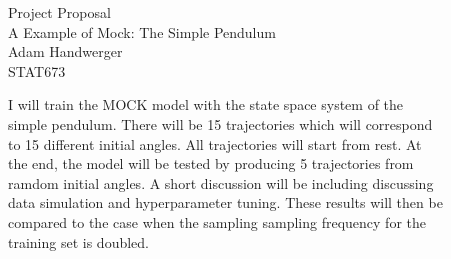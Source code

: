 \documentclass[12pt.]{article}
\begin{document}
\begin{centering}
Project Proposal\\
A Example of Mock: The Simple Pendulum\\
Adam Handwerger\\
STAT673\\
\end{centering}
\vspace{1cm}
I will train the MOCK model with the state space system of the\\
simple pendulum. There will be 15 trajectories which will correspond\\
to 15 different initial angles. All trajectories will start from rest. At\\
the end, the model will be tested by producing 5 trajectories from\\
ramdom initial angles. A short discussion will be including discussing\\
data simulation and hyperparameter tuning. These results will then be\\
compared to the case when the sampling sampling frequency for the\\
training set is doubled.\\
\end{document}
